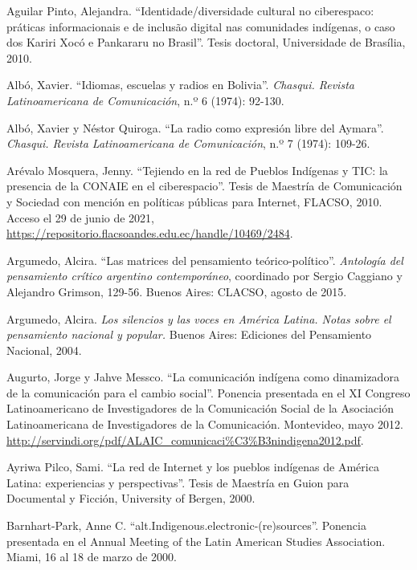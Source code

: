 \documentclass{tufte-handout}
\begin{document}
\begin{hangparas}{.25in}{1} 



Aguilar Pinto, Alejandra. ``Identidade/diversidade cultural no
ciberespaco: práticas informacionais e de inclusão digital nas
comunidades indígenas, o caso dos Kariri Xocó e Pankararu no Brasil''.
Tesis doctoral, Universidade de Brasília, 2010.

Albó, Xavier. ``Idiomas, escuelas y radios en Bolivia''. \emph{Chasqui.
Revista Latinoamericana de Comunicación}, n.º 6 (1974): 92-130.

Albó, Xavier y Néstor Quiroga. ``La radio como expresión libre del
Aymara''. \emph{Chasqui. Revista Latinoamericana de Comunicación}, n.º 7
(1974): 109-26.

Arévalo Mosquera, Jenny. ``Tejiendo en la red de Pueblos Indígenas y
TIC: la presencia de la CONAIE en el ciberespacio''. Tesis de Maestría
de Comunicación y Sociedad con mención en políticas públicas para
Internet, FLACSO, 2010. Acceso el 29 de junio de 2021,
\url{https://repositorio.flacsoandes.edu.ec/handle/10469/2484}.

Argumedo, Alcira. ``Las matrices del pensamiento teórico-político''.
\emph{Antología del pensamiento crítico argentino contemporáneo},
coordinado por Sergio Caggiano y Alejandro Grimson, 129-56. Buenos
Aires: CLACSO, agosto de 2015.

Argumedo, Alcira. \emph{Los silencios y las voces en América Latina.
Notas sobre el pensamiento nacional y popular.} Buenos Aires: Ediciones
del Pensamiento Nacional, 2004.

Augurto, Jorge y Jahve Messco. ``La comunicación indígena como
dinamizadora de la comunicación para el cambio social''. Ponencia
presentada en el XI Congreso Latinoamericano de Investigadores de la
Comunicación Social de la Asociación Latinoamericana de Investigadores
de la Comunicación. Montevideo, mayo 2012. \href{http://servindi.org/pdf/ALAIC\_comunicaci\%C3\%B3nindigena2012.pdf}{http://servindi.org/pdf/ALAIC\_comunicaci\%C3\%B3nindigena2012.pdf}.

Ayriwa Pilco, Sami. ``La red de Internet y los pueblos indígenas de
América Latina: experiencias y perspectivas''. Tesis de Maestría en
Guion para Documental y Ficción, University of Bergen, 2000.

Barnhart-Park, Anne C. ``alt.Indigenous.electronic-(re)sources''.
Ponencia presentada en el Annual Meeting of the Latin American Studies
Association. Miami, 16 al 18 de marzo de 2000.


\end{hangparas}
\end{document}
